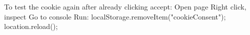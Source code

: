   To test the cookie again after already clicking accept: 
  Open page 
  Right click, inspect 
  Go to console
  Run: 
  localStorage.removeItem("cookieConsent");
  location.reload(); 